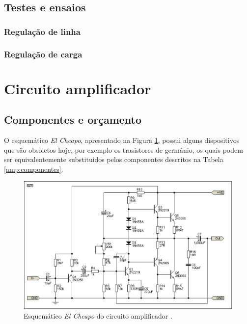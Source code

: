 \documentclass[a4paper,12pt,oneside,openany,table,xcdraw]{article}
\begin{document}
\subsection{Testes e ensaios} %
\subsubsection{Regulação de linha}

\subsubsection{Regulação de carga}


\newpage
\section{Circuito amplificador} \label{amp}
\subsection{Componentes e orçamento} 
O esquemático \emph{El Cheapo}, apresentado na Figura \ref{amp:esquematico}, possui alguns dispositivos que são obsoletos hoje, por exemplo os trasistores de germânio, os quais podem ser equivalentemente substituidos pelos componentes descritos na Tabela \ref{amp:componentes}. 
\vspace{0.2cm}

\begin{figure}[H]
\centering
\includegraphics[width=15cm]{amp-esquematico}
\caption{Esquemático \emph{El Cheapo} do circuito amplificador \cite{cheapo}.}
\label{amp:esquematico}
\end{figure}
\end{document}
